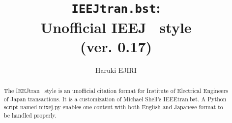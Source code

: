 \documentclass[11pt, a4paper, dvipdfmx]{article}
\title{\texttt{IEEJtran.bst}:\\Unofficial IEEJ \BibTeX\ style\\(ver. 0.17)}
\author{Haruki EJIRI}
\begin{document}
\maketitle

\begin{abstract}
The IEEJtran \BibTeX\ style is an unofficial citation format for Institute of Electrical Engineers of Japan transactions.
It is a customization of Michael Shell's IEEEtran.bst.
A Python script named mixej.py enables one content with both English and Japanese format to be handled properly.
\end{abstract}
\end{document}
